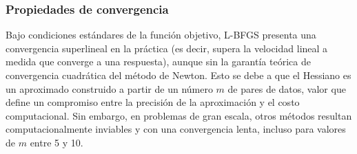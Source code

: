 \subsubsection*{Propiedades de convergencia}

Bajo condiciones estándares de la función objetivo, L-BFGS presenta una convergencia superlineal en la práctica (es decir, supera la velocidad lineal a medida que converge a una respuesta), aunque sin la garantía teórica de convergencia cuadrática del método de Newton. Esto se debe a que el Hessiano es un aproximado construido a partir de un número \(m\) de pares de datos, valor que define un compromiso entre la precisión de la aproximación y el costo computacional. Sin embargo, en problemas de gran escala, otros métodos resultan computacionalmente inviables y con una convergencia lenta, incluso para valores de \(m\) entre 5 y 10.
